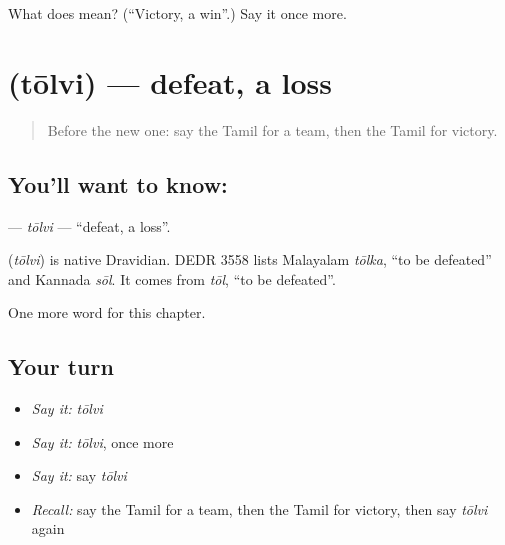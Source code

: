 \begin{tcolorbox}[breakable,colback=teal!4,colframe=teal!35!black,title={Before you move on}]
What does  mean? (\textquotedblleft{}Victory, a win\textquotedblright{}.) Say it once more.
\end{tcolorbox}
\section[\texorpdfstring{\ta{தோல்வி} (tōlvi)}{தோல்வி (tōlvi)}]{ (tōlvi) — defeat, a loss}

\label{lesson:TA-C277-tolvi}



\begin{quote}
Before the new one: say the Tamil for a team, then the Tamil for victory.
\end{quote}

\subsection*{You'll want to know: }
\textbf{} — \emph{tōlvi} — \textquotedblleft{}defeat, a loss\textquotedblright{}.

\begin{cousinweb}
\textbf{} (\emph{tōlvi}) is native Dravidian. DEDR 3558 lists Malayalam \emph{tōlka}, \textquotedblleft{}to be defeated\textquotedblright{} and Kannada \emph{sōl}. It comes from \emph{tōl}, \textquotedblleft{}to be defeated\textquotedblright{}.
\end{cousinweb}

\begin{grammarlens}[title={What you've built}]
One more word for this chapter.
\end{grammarlens}

\subsection*{Your turn}
\begin{itemize}
\raggedright
  \item \emph{Say it:} \emph{tōlvi}
  \item \emph{Say it:} \emph{tōlvi}, once more
  \item \emph{Say it:} say \emph{tōlvi}
  \item \emph{Recall:} say the Tamil for a team, then the Tamil for victory, then say \emph{tōlvi} again
\end{itemize}

